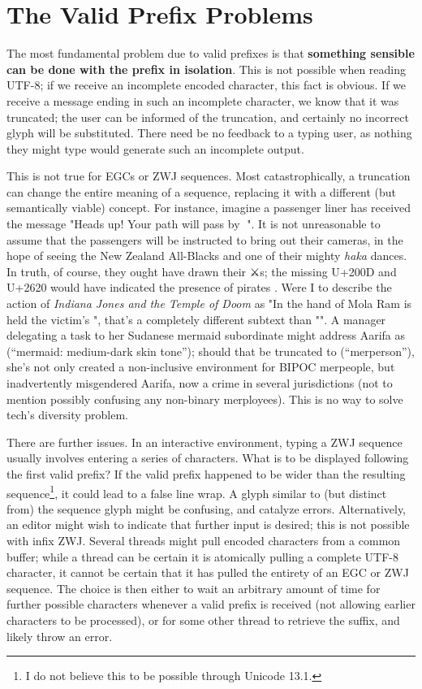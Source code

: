 \documentclass[letterpaper,10pt]{article}
\begin{document}
\section{The Valid Prefix Problems}

The most fundamental problem due to valid prefixes is that \textbf{something
sensible can be done with the prefix in isolation}. This is not possible when
reading UTF-8; if we receive an incomplete encoded character, this fact is
obvious. If we receive a message ending in such an incomplete character, we
know that it was truncated; the user can be informed of the truncation, and
certainly no incorrect glyph will be substituted. There need be no feedback
to a typing user, as nothing they might type would generate such an incomplete
output.

This is not true for EGCs or ZWJ sequences. Most catastrophically, a
truncation can change the entire meaning of a sequence, replacing it with
a different (but semantically viable) concept. For instance, imagine
a passenger liner has received the message "Heads up! Your path will
pass by 🏴". It is not unreasonable to assume that the passengers will
be instructed to bring out their cameras, in the hope of seeing the
New Zealand All-Blacks and one of their mighty \textit{haka} dances.
In truth, of course, they ought have drawn their ⚔️s; the missing U+200D
and U+2620 would have indicated the presence of pirates .
Were I to describe the action of \textit{Indiana Jones and the Temple of Doom}
as "In the hand of Mola Ram is held the victim's ", that's a completely
different subtext than "". A manager
delegating a task to her Sudanese mermaid subordinate might address Aarifa
as  (``mermaid: medium-dark skin
tone''); should that be truncated to  (``merperson''),
she's not only created a non-inclusive environment for BIPOC merpeople,
but inadvertently misgendered Aarifa, now a crime in several jurisdictions
(not to mention possibly confusing any non-binary merployees). This is
no way to solve tech's diversity problem.

There are further issues. In an interactive environment, typing a ZWJ
sequence usually involves entering a series of characters. What is to be
displayed following the first valid prefix? If the valid prefix happened
to be wider than the resulting sequence\footnote{I do not believe this to
be possible through Unicode 13.1.}, it could lead to a false line
wrap. A glyph similar to (but distinct from) the sequence glyph might be
confusing, and catalyze errors. Alternatively, an editor might wish to
indicate that further input is desired; this is not possible with infix
ZWJ. Several threads might pull encoded characters from a common buffer;
while a thread can be certain it is atomically pulling a complete UTF-8
character, it cannot be certain that it has pulled the entirety of an
EGC or ZWJ sequence. The choice is then either to wait an arbitrary amount
of time for further possible characters whenever a valid prefix is
received (not allowing earlier characters to be processed), or for some
other thread to retrieve the suffix, and likely throw an error.
\end{document}

